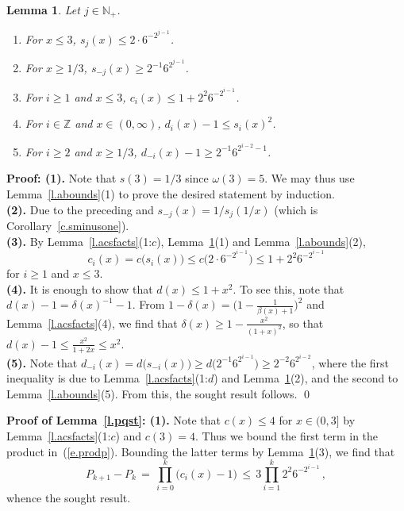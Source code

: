 \documentclass[letterpaper,11pt,oneside,reqno]{amsbook}
\newcommand{\N}{\ensuremath{\mathbb{N}}}
\newcommand{\Z}{\ensuremath{\mathbb{Z}}}
\numberwithin{figure}{chapter}
\newtheorem{lemma}[theorem]{Lemma}
\theoremstyle{definition}
\theoremstyle{definition}
\theoremstyle{definition}
\theoremstyle{definition}
\theoremstyle{definition}
\newcommand{\nwithoutzero}{\N_+}
\newcommand{\macsee}{c}
\newcommand{\macbeta}{\beta}
\newcommand{\macomega}{\omega}
\newcommand{\macdee}{d}
\newcommand{\macgdee}{\delta}
\begin{document}
\begin{lemma}\label{l.stbounds}
Let $j \in \nwithoutzero$. 
\begin{enumerate}
\item For $x \leq 3$, $s_j(x) \leq 2 \cdot 6^{-2^{j-1}}$. 
\item For $x \geq 1/3$, $s_{-j}(x) \geq 2^{-1}  6^{2^{j-1}}$.
\item For $i \geq 1$ and $x \leq 3$, $\macsee_i(x) \leq  1 +  2^2 6^{-2^{i-1}}$. 
\item For $i \in \Z$ and $x \in (0,\infty)$, $\macdee_i(x) - 1 \leq s_i(x)^2$.
\item For $i \geq 2$ and $x \geq 1/3$, $\macdee_{-i}(x)-1  \geq 2^{-1}6^{2^{i-2}-1}$.
\end{enumerate}
\end{lemma}
{\bf Proof: (1).} Note that $s(3) = 1/3$ since $\macomega(3) = 5$. We may thus use Lemma~\ref{l.abounds}(1) to prove the desired statement by induction.  \\
{\bf (2).} Due to the preceding and $s_{-j}(x) = 1/s_j(1/x)$ (which is Corollary~\ref{c.sminusone}). \\
{\bf (3).}
By Lemma~\ref{l.acsfacts}(1:$c$), Lemma~\ref{l.stbounds}(1) and Lemma~\ref{l.abounds}(2), 
$$
\macsee_i(x) = \macsee \big( s_i(x) \big) \leq  \macsee \big( 2 \cdot 6^{-2^{i-1}}  \big) \leq 1 +  2^2 6^{-2^{i-1}}
$$ 
for $i \geq 1$ and $x \leq 3$. \\
{\bf (4).} It is enough to show that $\macdee(x) \leq 1 + x^2$. To see this, note that $\macdee(x) - 1 = \macgdee(x)^{-1} - 1$. From $1 - \macgdee(x) = \big( 1- \tfrac{1}{\macbeta(x) +1} \big)^2$
and Lemma~\ref{l.acsfacts}(4), we find that $\macgdee(x) \geq 1 - \tfrac{x^2}{(1+x)^2}$, so that $\macdee(x) - 1 \leq \tfrac{x^2}{1+2x} \leq x^2$. \\
{\bf (5).} Note that $\macdee_{-i}(x) =  \macdee\big(s_{-i}(x)\big) \geq  \macdee\big(2^{-1}6^{2^{i-1}}\big) \geq 2^{-2}6^{2^{i-2}}$, where the first inequality is due to  Lemma~\ref{l.acsfacts}(1:$d$)  and Lemma~\ref{l.stbounds}(2),
and the second to Lemma~\ref{l.abounds}(5). From this, the sought result follows. \qed


{\bf Proof of Lemma~\ref{l.pqst}: (1).} Note that $\macsee(x) \leq 4$ for $x \in (0,3]$ by Lemma~\ref{l.acsfacts}(1:$c$) and $\macsee(3)=4$. Thus we bound the first term in the product in~(\ref{e.prodp}).
 Bounding the latter terms by Lemma~\ref{l.stbounds}(3), we find that 
$$
 P_{k+1} - P_k \, = \, \prod_{i=0}^k \big( \macsee_i(x) - 1 \big) \, \leq \, 3 \prod_{i=1}^k   2^2 6^{-2^{i-1}}
  \, ,
$$
whence the sought result. 
\end{document}
